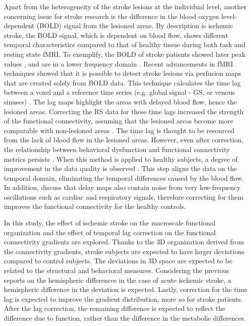 \documentclass[fleqn,10pt]{wlscirep}
\begin{document}
Apart from the heterogeneity of the stroke lesions at the individual level, another concerning issue for stroke research is the difference in the blood oxygen level-dependent (BOLD) signal from the lesioned areas. By description is ischemic stroke, the BOLD signal, which is dependent on blood flow, shows different temporal characteristics compared to that of healthy tissue during both task and resting state fMRI. To exemplify, the BOLD of stroke patients showed later peak values \citep{altamura2009longitudinal, bonakdarpour2015variability}, and are in a lower frequency domain  \citep{siegel2016effects}.
Recent advancements in fMRI techniques showed that it is possible to detect stroke lesions via perfusion maps that are created solely from BOLD data. This technique calculates the time lag between a voxel and a reference time series (e.g. global signal - GS, or venous sinuses) \citep{tong2017perfusion, lv2013identifying,braban2023cerebrovascular,khalil2020non}. The lag maps highlight the areas with delayed blood flow, hence the lesioned areas. Correcting the RS data for these time lags increased the strength of the functional connectivity, assuming that the lesioned areas become more comparable with non-lesioned areas \citep{siegel2016effects}. The time lag is thought to be resourced from the lack of blood flow in the lesioned areas. However, even after correction, the relationship between behavioral dysfunction and functional connectivity metrics persists \citep{siegel2016effects}. When this method is applied to healthy subjects, a degree of improvement in the data quality is observed \citep{erdougan2016correcting}. This step aligns the data on the temporal domain, eliminating the temporal differences caused by the blood flow. In addition, \citet{tong2019low} discuss that delay maps also contain noise from very low-frequency oscillations such as cardiac and respiratory signals, therefore correcting for them improves the functional connectivity for the healthy controls. 

In this study, the effect of ischemic stroke on the macroscale functional organization and the effect of temporal lag correction on the functional connectivity gradients are explored. Thanks to the 3D organization derived from the connectivity gradients, stroke subjects are expected to have larger deviations compared to control subjects. The deviations in 3D space are expected to be related to the structural and behavioral measures. Considering the previous reports on the hemispheric differences in the case of acute ischemic stroke, a hemispheric difference in the deviation is expected. Lastly, correction for the time lag is expected to improve the gradient distribution, more so for stroke patients. After the lag correction, the remaining difference is expected to reflect the difference due to function, rather than the difference in the metabolic differences. 
\end{document}
